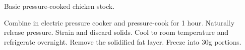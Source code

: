 \documentclass[main]{subfiles}
\begin{document}
Basic pressure-cooked chicken stock.

\begin{rec}
Combine in electric pressure cooker and pressure-cook for 1 hour.
\newstep
Naturally release pressure.
Strain and discard solids.
Cool to room temperature and refrigerate overnight.
\newstep
Remove the solidified fat layer.
Freeze into 30g portions.
\end{rec}

\end{document}
